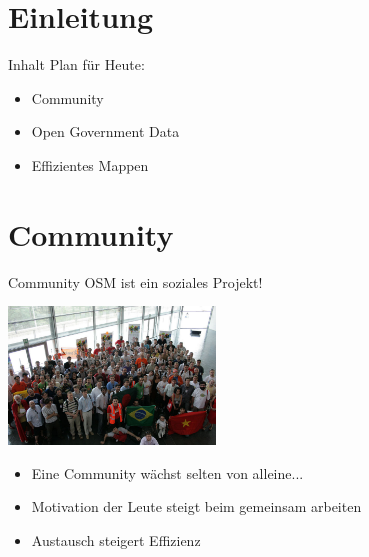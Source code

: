 \documentclass{beamer}
\begin{document}
\section{Einleitung}

\begin{frame}{Inhalt}
	Plan für Heute:
	\vspace{7mm}
	\begin{itemize}
		  \item Community
			  \pause
			  \vspace{7mm}
		  \item Open Government Data
			  \pause
			  \vspace{7mm}
		  \item Effizientes Mappen
	  \end{itemize}
\end{frame}

\section{Community}

\begin{frame}{Community}
	OSM ist ein soziales Projekt!

	\begin{center}
	  \includegraphics[width=5.5cm]{sotm.jpg}
	\end{center}

	\begin{itemize}
		  \item Eine Community wächst selten von alleine...
		  \item Motivation der Leute steigt beim gemeinsam arbeiten
		  \item Austausch steigert Effizienz
	  \end{itemize}
\end{frame}
\end{document}
